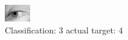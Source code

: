 \begin{figure}[h!]
\begin{center}
\includegraphics[width=0.60\columnwidth]{figures/ID2889_class_3_target_4.png}
\end{center}
\caption{ Classification: 3 actual target: 4}
\label{fig:ID2889_class_3_target_4}
\end{figure}
